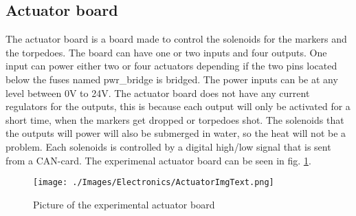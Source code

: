 \subsection{Actuator board} %
The actuator board is a board made to control the solenoids for the markers and the torpedoes. The board can have one or two inputs and four outputs. One input can power either two or four actuators depending if the two pins located below the fuses named pwr\_bridge is bridged. The power inputs can be at any level between 0V to 24V. The actuator board does not have any current regulators for the outputs, this is because each output will only be activated for a short time, when the markers get dropped or torpedoes shot. The solenoids that the outputs will power will also be submerged in water, so the heat will not be a problem. Each solenoids is controlled by a digital high/low signal that is sent from a CAN-card. The experimenal actuator board can be seen in fig. \ref{ActuatorImgText}.

\begin{figure}[!ht]
	\begin{center}
		\texttt{[image: ./Images/Electronics/ActuatorImgText.png]}
		\caption{Picture of the experimental actuator board}
		\label{ActuatorImgText}
	\end{center}
\end{figure}


	
